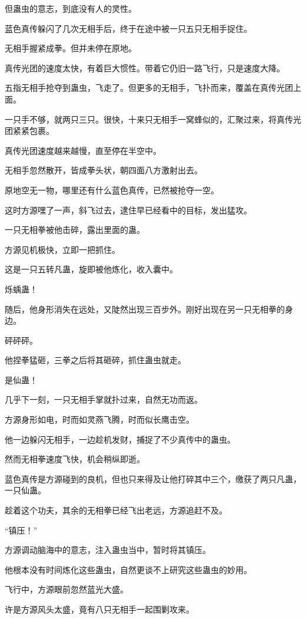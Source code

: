 \begin{this_body}
但蛊虫的意志，到底没有人的灵性。

蓝色真传躲闪了几次无相手后，终于在途中被一只五只无相手捉住。

无相手握紧成拳。但并未停在原地。

真传光团的速度太快，有着巨大惯性。带着它仍旧一路飞行，只是速度大降。

五指无相手抢夺到蛊虫，飞走了。但更多的无相手，飞扑而来，覆盖在真传光团上面。

一只手不够，就两只三只。很快，十来只无相手一窝蜂似的，汇聚过来，将真传光团紧紧包裹。

真传光团速度越来越慢，直至停在半空中。

无相手忽然散开，皆成拳头状，朝四面八方激射出去。

原地空无一物，哪里还有什么蓝色真传，已然被抢夺一空。

这时方源嘿了一声，斜飞过去，逮住早已经看中的目标，发出猛攻。

一只无相拳被他击碎，露出里面的蛊。

方源见机极快，立即一把抓住。

这是一只五转凡蛊，旋即被他炼化，收入囊中。

烁蝺蛊！

随后，他身形消失在远处，又陡然出现三百步外。刚好出现在另一只无相拳的身边。

砰砰砰。

他捏拳猛砸，三拳之后将其砸碎，抓住蛊虫就走。

是仙蛊！

几乎下一刻，一只无相手掌就扑过来，自然无功而返。

方源身形如电，时而如灵燕飞腾，时而似长鹰击空。

他一边躲闪无相手，一边趁机发财，捕捉了不少真传中的蛊虫。

然而无相拳速度飞快，机会稍纵即逝。

蓝色真传是方源碰到的良机，但也只来得及让他打碎其中三个，缴获了两只凡蛊，一只仙蛊。

趁着这个功夫，其余的无相拳已经飞出老远，方源追赶不及。

“镇压！”

方源调动脑海中的意志，注入蛊虫当中，暂时将其镇压。

他根本没有时间炼化这些蛊虫，自然更谈不上研究这些蛊虫的妙用。

飞行中，方源眼前忽然蓝光大盛。

许是方源风头太盛，竟有八只无相手一起围剿攻来。


\end{this_body}
